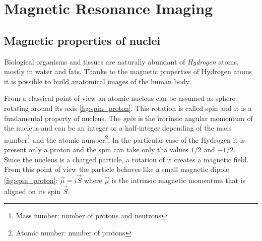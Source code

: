 \section{Magnetic Resonance Imaging}
 \subsection{Magnetic properties of nuclei}
 Biological organisms and tissues are naturally abundant of \emph{Hydrogen} atoms, mostly in water and fats. Thanks to the magnetic properties of Hydrogen atoms it is possible to build anatomical images of the human body.

 From a classical point of view an atomic nucleus can be assumed as sphere rotating around its axis \ref{fig:spin_proton}. This rotation is called spin and it is a fundamental property of nucleus. The \emph{spin} is the intrinsic angular momentum of the nucleus and can be an integer or a half-integer depending of the mass number\footnote{Mass number: number of protons and neutrons} and the atomic number\footnote{Atomic number: number of protons}. In the particular case of the Hydrogen it is present only a proton and the spin can take only tha values $1/2$ and $-1/2$. \\
 Since the nucleus is a charged particle, a rotation of it creates a magnetic field. From this point of view the particle behaves like a small magnetic dipole \ref{fig:spin_proton}: $\vec{\mu}=i\vec{S}$ where $\vec{\mu}$ is the intrinsic magnetic momentum that is aligned on its spin $\vec{S}$.

